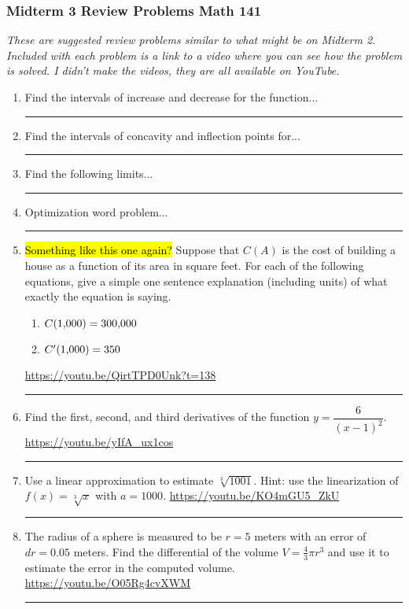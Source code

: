 \documentclass[12pt]{article}
\begin{document}
\pagestyle{empty}
\subsubsection*{Midterm 3 Review Problems \hfill Math 141 }
\textit{These are suggested review problems similar to what might be on Midterm 2. Included with each problem is a link to a video where you can see how the problem is solved. I didn't make the videos, they are all  available on YouTube.}

\begin{enumerate}
\item Find the intervals of increase and decrease for the function...
\vfill 
\hfill  \url{} 
\hrule 

\item Find the intervals of concavity and inflection points for...
\vfill 
\hfill  \url{} 
\hrule 

\item Find the following limits...
\vfill
\hfill \url{}
\hrule


\item Optimization word problem...
\vfill
\hfill \url{}
\hrule

\newpage
\item \hl{Something like this one again?} Suppose that $C(A)$ is the cost of building a house as a function of its area in square feet.  For each of the following equations, give a simple one sentence explanation (including units) of what exactly the equation is saying. 
\begin{enumerate}
\item $C(1{\small,}000) = 300{\small,}000$
\item $C'(1{\small,}000) = 350$ 
\end{enumerate}
\vfill
\hfill \url{https://youtu.be/QirtTPD0Unk?t=138}
\hrule

\item Find the first, second, and third derivatives of the function $y = \dfrac{6}{(x-1)^2}$. 
\vfill
\hfill \url{https://youtu.be/yIfA_ux1cos}
\hrule


\item Use a linear approximation to estimate $\sqrt[3]{1001}$.  Hint: use the linearization of $f(x) = \sqrt[3]{x}$ with $a = 1000$. 
\vfill
\hfill \url{https://youtu.be/KO4mGU5_ZkU}
\hrule

\item The radius of a sphere is measured to be $r = 5$ meters with an error of $dr = 0.05$ meters. Find the differential of the volume $V = \tfrac{4}{3} \pi r^3$ and use it to estimate the error in the computed volume. 
\vfill
\hfill \url{https://youtu.be/O05Rg4cvXWM}
\hrule



\end{enumerate}
\end{document}
